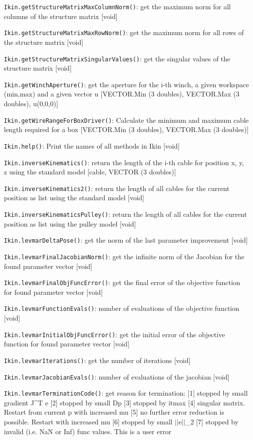 \documentclass[11pt,a4paper,onepage,openany]{book}
\begin{document}
\texttt{Ikin.getStructureMatrixMaxColumnNorm()}: get the maximum norm for all columns of the structure matrix [void]

\texttt{Ikin.getStructureMatrixMaxRowNorm()}: get the maximum norm for all rows of the structure matrix [void]

\texttt{Ikin.getStructureMatrixSingularValues()}: get the singular values of the structure matrix [void]

\texttt{Ikin.getWinchAperture()}: get the aperture for the i-th winch, a given workspace (min,max) and a given vector u [VECTOR.Min (3 doubles), VECTOR.Max (3 doubles), u(0,0,0)]

\texttt{Ikin.getWireRangeForBoxDriver()}: Calculate the minimum and maximum cable length required for a box [VECTOR.Min (3 doubles), VECTOR.Max (3 doubles)]

\texttt{Ikin.help()}: Print the names of all methods in Ikin [void]

\texttt{Ikin.inverseKinematics()}: return the length of the i-th cable for position x, y, z using the standard model [cable, VECTOR (3 doubles)]

\texttt{Ikin.inverseKinematics2()}: return the length of all cables for the current position as list using the standard model [void]

\texttt{Ikin.inverseKinematicsPulley()}: return the length of all cables for the current position as list using the pulley model [void]

\texttt{Ikin.levmarDeltaPose()}: get the norm of the last parameter improvement [void]

\texttt{Ikin.levmarFinalJacobianNorm()}: get the infinite norm of the Jacobian for the found parameter vector [void]

\texttt{Ikin.levmarFinalObjFuncError()}: get the final error of the objective function for found parameter vector [void]

\texttt{Ikin.levmarFunctionEvals()}: number of evaluations of the objective function [void]

\texttt{Ikin.levmarInitialObjFuncError()}: get the initial error of the objective function for found parameter vector [void]

\texttt{Ikin.levmarIterations()}: get the number of iterations [void]

\texttt{Ikin.levmarJacobianEvals()}: number of evaluations of the jacobian [void]

\texttt{Ikin.levmarTerminationCode()}: get reason for termination: [1] stopped by small gradient J\^{}T e [2] stopped by small Dp [3] stopped by itmax [4] singular matrix. Restart from current p with increased mu [5] no further error reduction is possible. Restart with increased mu [6] stopped by small $||$e$||$\_2 [7] stopped by invalid (i.e. NaN or Inf) func values. This is a user error
\end{document}
